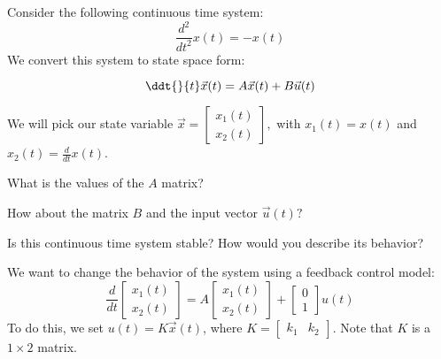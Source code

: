 

Consider the following continuous time system:
$$
\frac{d^2}{dt^2} x(t) = -x(t)
$$
We convert this system to state space form:

\begin{equation}
  \ddt{}{t} \vec{x}(t) = A \vec{x}(t) + B \vec{u}(t)
\end{equation}

We will pick our state variable $\vec{x} = \begin{bmatrix} x_1(t) \\ x_2(t) \end{bmatrix},$
with $x_1(t) = x(t)$ and $x_2(t) = \frac{d}{dt} x(t)$. 

\begin{enumerate}

\qitem What is the values of the $A$ matrix?


\qitem How about the matrix $B$ and the input vector $\vec{u}(t)?$ 


\qitem Is this continuous time system stable? How would you describe its behavior?


\end{enumerate}

We want to change the behavior of the system using a feedback control model:
$$
\frac{d}{dt}
\begin{bmatrix}
x_1(t) \\
x_2(t)
\end{bmatrix}
=
A
\begin{bmatrix}
x_1(t) \\
x_2(t)
\end{bmatrix}
+ 
\begin{bmatrix}
0 \\
1
\end{bmatrix}
u(t)
$$
To do this, we set $u(t) = K\vec{x}(t)$, where $K = \begin{bmatrix} k_1 & k_2 \end{bmatrix}$. Note that $K$ is a $1 \times 2$ matrix.


